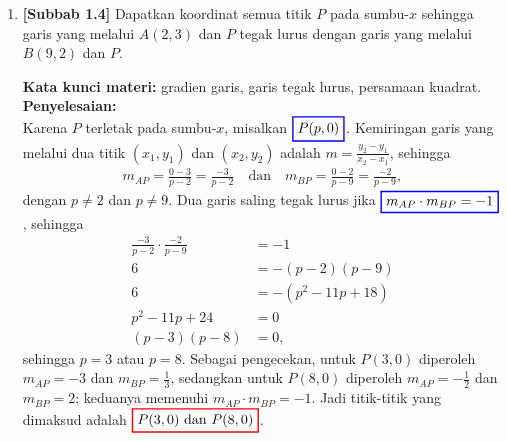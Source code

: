 \documentclass[10pt,openany,a4paper]{article}
\theoremstyle{definition}
\theoremstyle{definition}
\theoremstyle{plain}
\newenvironment{jawab}[2][tes]{%
\par\noindent\textbf{Kata kunci materi:} #1.\\
\textbf{Penyelesaian:} #2%
}{}
\begin{document}
\begin{enumerate}
    \item \textbf{[Subbab 1.4]} Dapatkan koordinat semua titik $P$ pada sumbu-$x$ sehingga garis yang melalui $A(2,3)$ dan $P$ tegak lurus dengan garis yang melalui $B(9,2)$ dan $P$.
    \begin{jawab}[gradien garis, garis tegak lurus, persamaan kuadrat]{~\\
        Karena $P$ terletak pada sumbu-$x$, misalkan $\colorlet{oldcolor}{.}
        \color{blue}
        \setlength{\fboxrule}{1pt} \boxed{\color{oldcolor}P(p,0)}\color{oldcolor}$. Kemiringan garis yang melalui dua titik $(x_1,y_1)$ dan $(x_2,y_2)$ adalah $m = \frac{y_2 - y_1}{x_2 - x_1}$, sehingga
        \begin{align*}
            m_{AP} = \frac{0-3}{p-2} = \frac{-3}{p-2} \quad\text{dan}\quad m_{BP} = \frac{0-2}{p-9} = \frac{-2}{p-9},
        \end{align*}
        dengan $p\neq 2$ dan $p\neq 9$. Dua garis saling tegak lurus jika $\colorlet{oldcolor}{.}
        \color{blue}
        \setlength{\fboxrule}{1pt} \boxed{\color{oldcolor}m_{AP}\cdot m_{BP}=-1}\color{oldcolor}$, sehingga
        \begin{align*}
            \frac{-3}{p-2}\cdot\frac{-2}{p-9} &= -1\\
            6 &= -(p-2)(p-9)\\
            6 &= -(p^2-11p+18)\\
            p^2-11p+24 &= 0\\
            (p-3)(p-8) &= 0,
        \end{align*}
        sehingga $p=3$ atau $p=8$. Sebagai pengecekan, untuk $P(3,0)$ diperoleh $m_{AP}=-3$ dan $m_{BP}=\frac{1}{3}$, sedangkan untuk $P(8,0)$ diperoleh $m_{AP}=-\frac{1}{2}$ dan $m_{BP}=2$; keduanya memenuhi $m_{AP}\cdot m_{BP}=-1$. Jadi titik-titik yang dimaksud adalah $\colorlet{oldcolor}{.}
        \color{red}
        \setlength{\fboxrule}{1pt} \boxed{\color{oldcolor}P(3,0) \text{ dan } P(8,0)}\color{oldcolor}$.
    }
    \end{jawab}


\end{enumerate}
\end{document}

